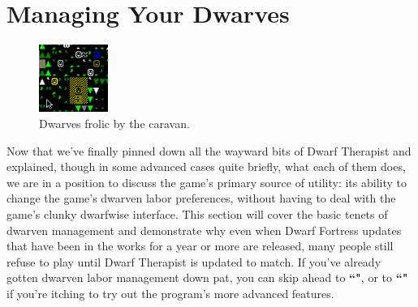 \documentclass[]{article}
\begin{document}
\section{Managing Your Dwarves}
\label{sec:Managing Your Dwarves}
\begin{figure}
\vspace{-20pt}
  \begin{center}
    \includegraphics[width=0.20\textwidth]{Sec2Fig1}
  \end{center}
\vspace{-10pt}
\caption{Dwarves frolic by the caravan.}
\end{figure}
Now that we've finally pinned down all the wayward bits of Dwarf Therapist and explained, though in
some advanced cases quite briefly, what each of them does, we are in a position to discuss the
game's primary source of utility: its ability to change the game's dwarven labor preferences,
without having to deal with the game's clunky dwarfwise interface. This section will cover the basic
tenets of dwarven management and demonstrate why even when Dwarf Fortress updates that have
been in the works for a year or more are released, many people still refuse to play until Dwarf
Therapist is updated to match. If you've already gotten dwarven labor management down pat, you can
skip ahead to \textbf{``"}, or to \textbf{``"} if
you're itching to try out the program's more advanced features.

\vfill
\end{document}
